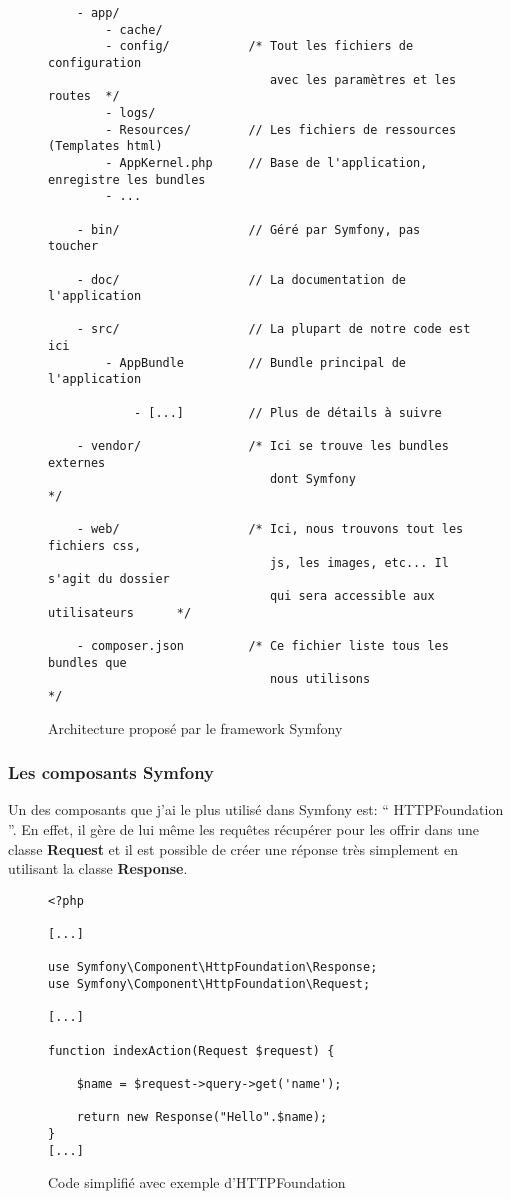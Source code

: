 \begin{figure}[h]
\begin{lstlisting}
    - app/
        - cache/
        - config/           /* Tout les fichiers de configuration
                               avec les paramètres et les routes  */
        - logs/
        - Resources/        // Les fichiers de ressources (Templates html)
        - AppKernel.php     // Base de l'application, enregistre les bundles
        - ...

    - bin/                  // Géré par Symfony, pas toucher

    - doc/                  // La documentation de l'application

    - src/                  // La plupart de notre code est ici
        - AppBundle         // Bundle principal de l'application

            - [...]         // Plus de détails à suivre

    - vendor/               /* Ici se trouve les bundles externes
                               dont Symfony                       */

    - web/                  /* Ici, nous trouvons tout les fichiers css,
                               js, les images, etc... Il s'agit du dossier
                               qui sera accessible aux utilisateurs      */

    - composer.json         /* Ce fichier liste tous les bundles que 
                               nous utilisons                       */
\end{lstlisting}
\caption{Architecture proposé par le framework Symfony}
\end{figure}

\newpage

\subsubsection*{Les composants Symfony}

Un des composants que j'ai le plus utilisé dans Symfony est: `` HTTPFoundation ''. En effet, il gère de lui même les requêtes récupérer pour les offrir dans une classe \textbf{Request} et il est possible de créer une réponse très simplement en utilisant la classe \textbf{Response}.

\begin{figure}[h]
\begin{lstlisting}[frame=single]
<?php

[...]

use Symfony\Component\HttpFoundation\Response;
use Symfony\Component\HttpFoundation\Request;

[...]

function indexAction(Request $request) {

    $name = $request->query->get('name');

    return new Response("Hello".$name);
}
[...]

\end{lstlisting}
\caption{Code simplifié avec exemple d'HTTPFoundation}
\end{figure}

